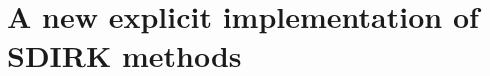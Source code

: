 \documentclass[10pt,a4paper]{article}
\begin{document}
        
	\section{A new explicit implementation of SDIRK  methods}
 \label{sec:main}
 
\end{document}
